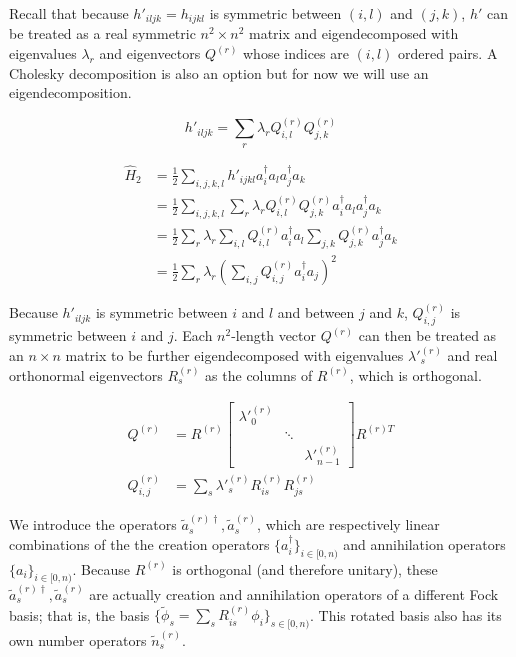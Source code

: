 Recall that because $h'_{iljk} = h_{ijkl}$ is symmetric between $(i, l)$ and $(j, k)$, $h'$ can be treated as a real symmetric $n^2 \times n^2$ matrix and eigendecomposed with eigenvalues $\lambda_r$ and eigenvectors $Q^{(r)}$ whose indices are $(i, l)$ ordered pairs. A Cholesky decomposition is also an option but for now we will use an eigendecomposition.

\begin{equation}
    h'_{iljk} = \sum_r \lambda_r Q^{(r)}_{i, l}Q^{(r)}_{j, k}
\end{equation}

\begin{equation}
    \begin{split}
        \hat{H}_2 &= \frac{1}{2}\sum_{i,j,k,l} h'_{ijkl}a^\dag_ia_la^\dag_ja_k \\
        &= \frac{1}{2}\sum_{i,j,k,l} \sum_r \lambda_r Q^{(r)}_{i, l}Q^{(r)}_{j, k}a^\dag_ia_la^\dag_ja_k \\
        &= \frac{1}{2}\sum_r \lambda_r \sum_{i,l} Q^{(r)}_{i, l}a^\dag_ia_l\sum_{j,k}Q^{(r)}_{j, k}a^\dag_ja_k \\
        &= \frac{1}{2}\sum_r\lambda_r\left(\sum_{i,j} Q^{(r)}_{i, j}a^\dag_ia_j\right)^2
    \end{split}
\end{equation}

Because $h'_{iljk}$ is symmetric between $i$ and $l$ and between $j$ and $k$, $Q^{(r)}_{i, j}$ is symmetric between $i$ and $j$. Each $n^2$-length vector $Q^{(r)}$ can then be treated as an $n \times n$ matrix to be further eigendecomposed with eigenvalues $\lambda'^{(r)}_s$ and real orthonormal eigenvectors $R^{(r)}_s$ as the columns of $R^{(r)}$, which is orthogonal.

\begin{equation}
    \begin{split}
        Q^{(r)} &= R^{(r)}\begin{bmatrix}
            \lambda'^{(r)}_0 & & \\ & \ddots & \\ & & \lambda'^{(r)}_{n - 1}
          \end{bmatrix}R^{(r)T} \\
        Q^{(r)}_{i, j} &= \sum_s \lambda'^{(r)}_s R^{(r)}_{is}R^{(r)}_{js}
    \end{split}
\end{equation}

We introduce the operators $\tilde{a}^{(r)\dag}_s, \tilde{a}^{(r)}_s$, which are respectively linear combinations of the the creation operators $\{a^\dag_i\}_{i \in [0, n)}$ and annihilation operators $\{a_i\}_{i \in [0, n)}$. Because $R^{(r)}$ is orthogonal (and therefore unitary), these $\tilde{a}^{(r)\dag}_s, \tilde{a}^{(r)}_s$ are actually creation and annihilation operators of a different Fock basis; that is, the basis $\{\tilde{\phi}_s = \sum_s R^{(r)}_{is} \phi_i\}_{s \in [0, n)}$. This rotated basis also has its own number operators $\tilde{n}^{(r)}_s$.

